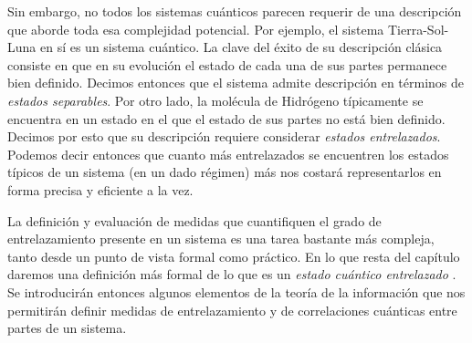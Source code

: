 Sin embargo, no todos los sistemas cuánticos parecen requerir de una descripción que aborde toda esa complejidad potencial. Por ejemplo, el sistema 
Tierra-Sol-Luna en sí es un sistema cuántico. La clave del éxito de su descripción clásica consiste en que en su evolución el estado de cada una de
sus partes permanece bien definido. Decimos entonces que el sistema admite descripción en términos de  \emph{estados separables}. Por otro lado, la 
molécula de Hidrógeno típicamente se encuentra en un estado en el que el estado de sus partes no está bien definido. Decimos por esto que su descripción
requiere considerar \emph{estados entrelazados}.  Podemos decir entonces que cuanto más entrelazados se encuentren los estados típicos de un sistema 
(en un dado régimen) más nos costará representarlos en forma precisa y eficiente a la vez.

La definición y evaluación
de medidas que cuantifiquen el grado de entrelazamiento presente en un sistema es una tarea bastante más compleja, tanto desde un punto de vista formal 
como práctico. En lo que resta del capítulo daremos una definición más formal de lo que es un  \emph{estado cuántico entrelazado} \cite{NC.00,V.07,Sch1,BDSW.96}. 
Se introducirán entonces algunos elementos de la teoría de la información que nos permitirán definir medidas de entrelazamiento y de correlaciones cuánticas entre
 partes de un sistema.
 

